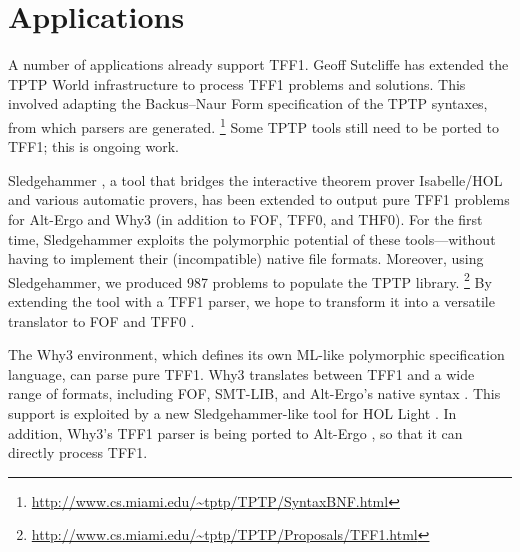 \section{Applications}
\label{sec_apps}

A number of applications already support TFF1. Geoff
Sutcliffe has extended the TPTP World infrastructure to process TFF1 problems
and solutions. This involved adapting the Backus--Naur Form specification of the
TPTP syntaxes, from which parsers are generated.%
\footnote{\url{http://www.cs.miami.edu/~tptp/TPTP/SyntaxBNF.html}}
Some TPTP tools still need to be ported to TFF1; this is ongoing work.


Sledgehammer \cite{paulson-blanchette-2010}, a tool that bridges the interactive
theorem prover Isabelle\slash HOL and various automatic provers, has been
extended to output pure TFF1 problems for Alt-Ergo and Why3
(in addition to FOF, TFF0, and THF0). For the first time, Sledgehammer
exploits the polymorphic potential of these tools---without having
to implement their (incompatible) native file formats.
Moreover, using Sledgehammer, we produced 987 problems to populate the TPTP
library.%
\footnote{\url{http://www.cs.miami.edu/~tptp/TPTP/Proposals/TFF1.html}}
By extending the tool with a TFF1 parser,
we hope to transform it into a versatile translator to FOF and
TFF0 \cite{blanchette-et-al-2013-types}.

The Why3 \cite{bobot-et-al-2011} environment, which defines its own ML-like
polymorphic specification language, can parse pure TFF1. Why3 translates
between TFF1 and a wide range of
formats, including FOF, SMT-LIB, and
Alt-Ergo's native syntax \cite{couchot-lescuyer-2007,bobot-paskevich-2011}.
This support is exploited by a new Sledgehammer-like tool for HOL Light
\cite{kaliszyk-urban-2013}.
In addition, Why3's TFF1 parser is being ported to
Alt-Ergo \cite{bobot-et-al-2008}, so that it can directly process TFF1. %




